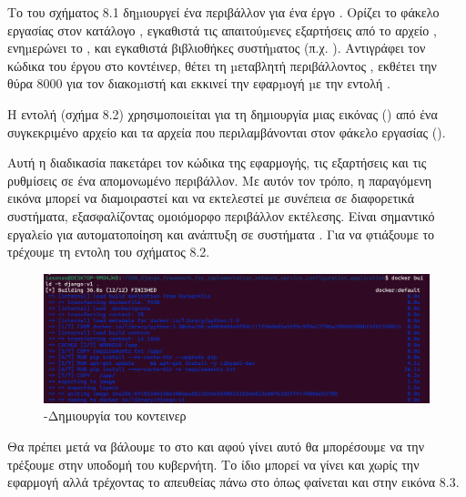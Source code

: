\FloatBarrier


Tο  του σχήματος 8.1 δηµιουργεί ένα περιβάλλον  για ένα έργο . Ορίζει το φάκελο εργασίας στον κατάλογο , εγκαθιστά τις απαιτούµενες εξαρτήσεις από το αρχείο  , ενηµερώνει το , και εγκαθιστά βιβλιοθήκες συστήµατος (π.χ. ). Αντιγράφει τον κώδικα του έργου  στο κοντέινερ, θέτει τη µεταβλητή περιβάλλοντος , εκθέτει την θύρα 8000 για τον διακοµιστή  και εκκινεί την εφαρµογή µε την εντολή .


Η εντολή (σχήμα 8.2) χρησιμοποιείται για τη δημιουργία μιας εικόνας  () 
από ένα συγκεκριμένο αρχείο  και τα αρχεία που περιλαμβάνονται στον φάκελο εργασίας ().

Αυτή η διαδικασία πακετάρει τον κώδικα της εφαρμογής, τις εξαρτήσεις και τις ρυθμίσεις σε ένα απομονωμένο περιβάλλον. 
Με αυτόν τον τρόπο, η παραγόμενη εικόνα μπορεί να διαμοιραστεί και να εκτελεστεί με συνέπεια σε διαφορετικά συστήματα, 
εξασφαλίζοντας ομοιόμορφο περιβάλλον εκτέλεσης. Είναι σημαντικό εργαλείο για αυτοματοποίηση και ανάπτυξη σε συστήματα . Για να φτιάξουμε το  τρέχουμε τη εντολη του σχήματος 8.2. 

\FloatBarrier

\begin{figure}[h]
	\centering
	\includegraphics[width=1.0\textwidth]{graphics/docker_build.png}
	\caption{-Δημιουργία του κοντεινερ}
\end{figure}

\FloatBarrier

Θα πρέπει μετά να βάλουμε το  στο  και αφού γίνει αυτό θα μπορέσουμε να την τρέξουμε στην υποδομή του κυβερνήτη.
Το ίδιο μπορεί να γίνει και χωρίς την εφαρμογή  αλλά τρέχοντας το 
απευθείας πάνω στο  όπως φαίνεται και στην εικόνα 8.3.

\FloatBarrier


